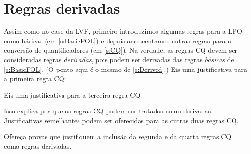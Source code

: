 \chapter{Regras derivadas}\label{s:DerivedFOL}
Assim como no caso da LVF, primeiro introduzimos algumas regras para a LPO como básicas (em \cref{s:BasicFOL}) e depois acrescentamos outras regras para a conversão de quantificadores (em \cref{s:CQ}). Na verdade, as regras CQ devem ser consideradas regras \emph{derivadas}, pois podem ser derivadas das regras \emph{básicas} de \cref{s:BasicFOL}. (O ponto aqui é o mesmo de \cref{s:Derived}.) Eis uma justificativa para a primeira regra CQ:
\begin{fitchproof}
	\open
		\AS
		\open
			\AS
		\close
	\close
\end{fitchproof}
Eis uma justificativa para a terceira regra CQ:
\begin{fitchproof}
	\open
		\AS
		\open
			\AS
		\close
	\close
\end{fitchproof}
Isso explica por que as regras CQ podem ser tratadas como derivadas. Justificativas semelhantes podem ser oferecidas para as outras duas regras CQ.

\practiceproblems

\problempart
Ofereça provas que justifiquem a inclusão da segunda e da quarta regras CQ como regras derivadas.




